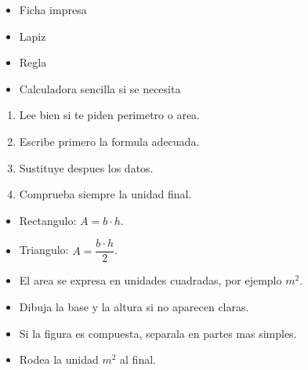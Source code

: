 \documentclass[12pt,a4paper]{article}
\begin{document}
        \FichaCabecera

        \begin{materialesbox}
        \begin{itemize}
    \item Ficha impresa
    \item Lapiz
    \item Regla
    \item Calculadora sencilla si se necesita
\end{itemize}
        \end{materialesbox}

        \begin{pasosbox}
        \begin{enumerate}
    \item Lee bien si te piden perimetro o area.
    \item Escribe primero la formula adecuada.
    \item Sustituye despues los datos.
    \item Comprueba siempre la unidad final.
\end{enumerate}
        \end{pasosbox}

        \begin{recordatoriobox}
        \begin{itemize}
    \item Rectangulo: $A=b\cdot h$.
    \item Triangulo: $A=\dfrac{b\cdot h}{2}$.
    \item El area se expresa en unidades cuadradas, por ejemplo $m^2$.
\end{itemize}
        \end{recordatoriobox}

        \begin{apoyobox}
        \begin{itemize}
    \item Dibuja la base y la altura si no aparecen claras.
    \item Si la figura es compuesta, separala en partes mas simples.
    \item Rodea la unidad $m^2$ al final.
\end{itemize}
        \end{apoyobox}


\end{document}
